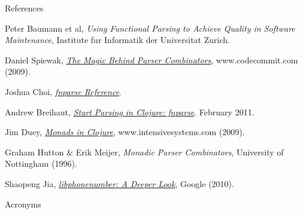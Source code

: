 \documentclass[presentation]{beamer}
\begin{document}
\begin{frame}{References}

\begin{thebibliography}{9}

 Peter Baumann et al,
\emph{Using Functional Parsing to Achieve Quality in Software
  Maintenance},
Institute fur Informatik der Universitat Zurich.

 Daniel Spiewak,
\href{http://www.codecommit.com/blog/scala/the-magic-behind-parser-combinators}{\emph{The
Magic Behind Parser Combinators}}, www.codecommit.com (2009).

 Joshua Choi,
  \href{https://github.com/joshua-choi/fnparse/wiki/Reference-of-FnParse-2}{\emph{fnparse Reference}}.

 Andrew Breihaut,
\href{http://brehaut.net/blog/2011/fnparse_introduction}{\emph{Start
    Parsing in Clojure: fnparse}}. February 2011.

 Jim Duey,
\href{http://www.intensivesystems.net/tutorials/monads_101.html}{\emph{Monads in Clojure}},
www.intensivesystems.com (2009).

 Graham Hutton \& Erik Meijer, \emph{Monadic Parser Combinators}, University
of Nottingham (1996).

 Shaopeng Jia,
\href{https://docs.google.com/present/view?id=0Ae6JSEqM3Qz6ZDk0bmd3d18yODRmejZ2N21kdw}{\emph{libphonenumber:
    A Deeper Look}}, Google (2010).

\end{thebibliography}

\end{frame}

\begin{frame}{Acronyms}
  \begin{acronym}[EBNF]
  \end{acronym}
\end{frame}
\end{document}

